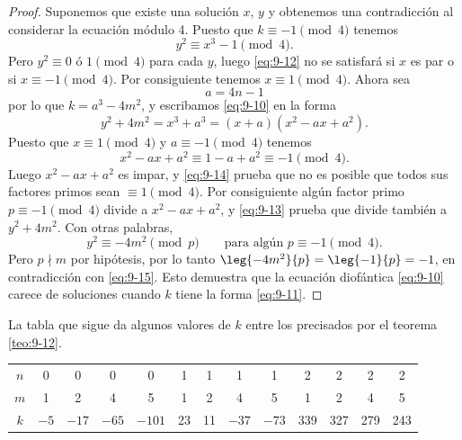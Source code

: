 \documentclass[12pt,a4paper]{book}
\begin{document}
    \begin{proof}
        Suponemos que existe una solución $x$, $y$ y obtenemos una contradicción al
        considerar la ecuación módulo 4. Puesto que $k\equiv-1\pmod{4}$ tenemos
        \begin{equation}\label{eq:9-12}
            y^{2}\equiv x^{3}-1\pmod{4}.
        \end{equation}
        Pero $y^{2}\equiv0$ ó $1\pmod{4}$ para cada $y$, luego \eqref{eq:9-12} no se
        satisfará si $x$ es par o si $x\equiv-1\pmod{4}$. Por consiguiente tenemos
        $x\equiv1\pmod{4}$. Ahora sea
        \begin{equation*}
            a=4n-1
        \end{equation*}
        por lo que $k=a^{3}-4m^{2}$, y escribamos \eqref{eq:9-10} en la forma
        \begin{equation}\label{eq:9-13}
            y^{2}+4m^{2}=x^{3}+a^{3}=(x+a)(x^{2}-ax+a^{2}).
        \end{equation}
        Puesto que $x\equiv1\pmod{4}$ y $a\equiv-1\pmod{4}$ tenemos
        \begin{equation}\label{eq:9-14}
            x^{2}-ax+a^{2}\equiv1-a+a^{2}\equiv-1\pmod{4}.
        \end{equation}
        Luego $x^{2}-ax+a^{2}$ es impar, y \eqref{eq:9-14} prueba que no es posible que todos
        sus factores primos sean $\equiv1\pmod{4}$. Por consiguiente algún factor primo
        $p\equiv-1\pmod{4}$ divide a $x^{2}-ax+a^{2}$, y \eqref{eq:9-13} prueba que divide
        también a $y^{2}+4m^{2}$. Con otras palabras,
        \begin{equation}\label{eq:9-15}
            y^{2}\equiv-4m^{2}\pmod{p}\qquad\text{para algún }p\equiv-1\pmod{4}.
        \end{equation}
        Pero $p\nmid m$ por hipótesis, por lo tanto $\leg{-4m^{2}}{p}=\leg{-1}{p}=-1$, en
        contradicción con \eqref{eq:9-15}. Esto demuestra que la ecuación diofántica
        \eqref{eq:9-10} carece de soluciones cuando $k$ tiene la forma \eqref{eq:9-11}.
    \end{proof}

    La tabla que sigue da algunos valores de $k$ entre los precisados por el teorema
    \ref{teo:9-12}.

    \begin{center}
        \begin{tabular}{c|cccccccccccc}
            $n$&0&0&0&0&1&1&1&1&2&2&2&2\\
            $m$&1&2&4&5&1&2&4&5&1&2&4&5\\
            $k$&$-5$&$-17$&$-65$&$-101$&23&11&$-37$&$-73$&339&327&279&243
        \end{tabular}
    \end{center}
\end{document}
